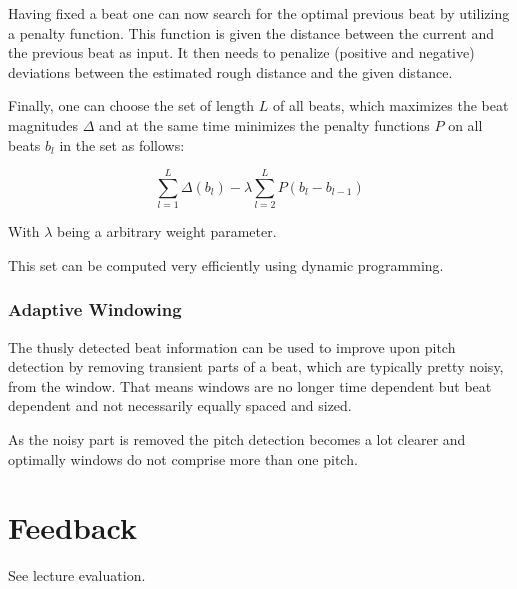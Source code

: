 \documentclass[a4paper, 9pt, twocolumn]{extarticle}
\begin{document}
Having fixed a beat one can now search for the optimal previous beat by utilizing a penalty function.
This function is given the distance between the current and the previous beat as input. It then needs to
penalize (positive and negative) deviations between the estimated rough distance and the given distance.

Finally, one can choose the set of length $L$ of all beats, which maximizes the beat magnitudes $\Delta$
and at the same time minimizes the penalty functions $P$ on all beats $b_l$ in the set as follows:

\begin{equation}
\sum_{l=1}^{L} \Delta (b_l) - \lambda \sum_{l=2}^{L} P(b_l - b_{l-1})
\end{equation}

With $\lambda$ being a arbitrary weight parameter.

This set can be computed very efficiently using dynamic programming.

\subsubsection{Adaptive Windowing}
The thusly detected beat information can be used to improve upon pitch detection by removing transient
parts of a beat, which are typically pretty noisy, from the window. That means windows are no longer
time dependent but beat dependent and not necessarily equally spaced and sized.

As the noisy part is removed the pitch detection becomes a lot clearer and optimally windows do not comprise
more than one pitch.

\newpage

\section{Feedback}
\label{section:feedback}

See lecture evaluation.


\small

\end{document}

